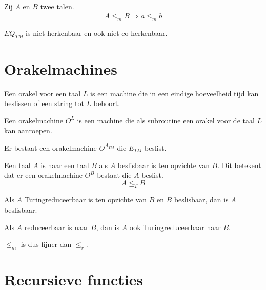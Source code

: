 \documentclass[main.tex]{subfiles}
\begin{document}
\begin{st}
  Zij $A$ en $B$ twee talen.
  \[ A \le_m B \Rightarrow \overline{a} \le_m \overline{b} \]
\end{st}

\begin{st}
  $EQ_{TM}$ is niet herkenbaar en ook niet co-herkenbaar.

\end{st}

\section{Orakelmachines}
\label{sec:orakelmachines}

\begin{de}
  Een orakel voor een taal $L$ is een machine die in een eindige hoeveelheid tijd kan beslissen of een string tot $L$ behoort.
\end{de}

\begin{de}
  Een orakelmachine $O^{L}$ is een machine die als subroutine een orakel voor de taal $L$ kan aanroepen.
\end{de}

\begin{st}
  Er bestaat een orakelmachine $O^{A_{TM}}$ die $E_{TM}$ beslist.
\end{st}

\begin{de}
  Een taal $A$ is  naar een taal $B$ als $A$ beslisbaar is ten opzichte van $B$.
  Dit betekent dat er een orakelmachine $O^{B}$ bestaat die $A$ beslist.
  \[ A \le_{T} B \]
\end{de}

\begin{st}
  Als $A$ Turingreduceerbaar is ten opzichte van $B$ en $B$ beslisbaar, dan is $A$ beslisbaar.
\end{st}

\begin{st}
  Als $A$ reduceerbaar is naar $B$, dan is $A$ ook Turingreduceerbaar naar $B$.
\end{st}

\begin{gev}
  $\le_{m}$ is dus fijner dan $\le_{r}$.
\end{gev}

\section{Recursieve functies}
\label{sec:recursieve-functies}
\end{document}
